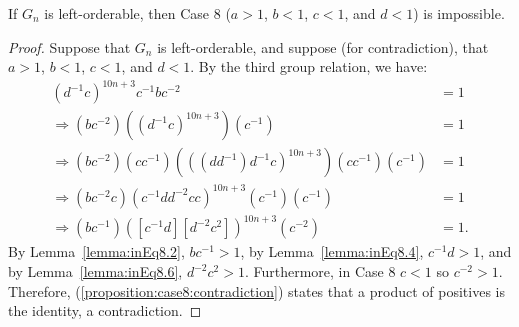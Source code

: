 \begin{proposition} If $G_n$ is left-orderable, then Case 8 ($a>1$, $b<1$, $c<1$, and $d<1$) is impossible.
\label{proposition:case8}
\end{proposition}
\begin{proof} Suppose that $G_n$ is left-orderable, and suppose (for contradiction), that $a>1$, $b<1$, $c<1$, and $d<1$.
By the third group relation, we have: 
\begin{align}
(d^{-1}c)^{10n+3}c^{-1}bc^{-2}&=1\nonumber{}\\
\Rightarrow{}(bc^{-2})((d^{-1}c)^{10n+3})(c^{-1})&=1\nonumber{}\\
\Rightarrow{}(bc^{-2})(cc^{-1})(((dd^{-1})d^{-1}c)^{10n+3})(cc^{-1})(c^{-1})&=1\nonumber{}\\
\Rightarrow{}(bc^{-2}c)(c^{-1}dd^{-2}cc)^{10n+3}(c^{-1})(c^{-1})&=1\nonumber{}\\
\Rightarrow{}(bc^{-1})([c^{-1}d][d^{-2}c^{2}])^{10n+3}(c^{-2})&=1.\label{proposition:case8:contradiction}
\end{align}
By Lemma~\ref{lemma:inEq8.2}, $bc^{-1}>1$, by Lemma~\ref{lemma:inEq8.4}, $c^{-1}d>1$, and by Lemma~\ref{lemma:inEq8.6}, $d^{-2}c^{2}>1$. Furthermore, in Case 8 $c<1$ so $c^{-2}>1$. Therefore, (\ref{proposition:case8:contradiction}) states that a product of positives is the identity, a contradiction.
\end{proof}